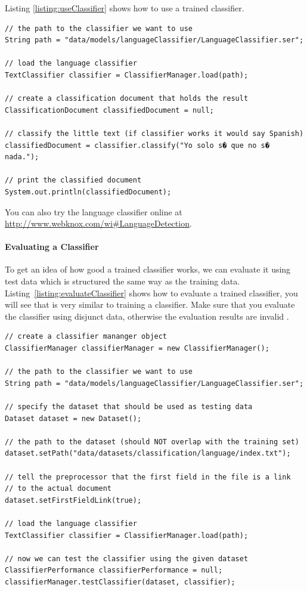 \documentclass[a4paper,twoside]{book}      %
\begin{document}
Listing \ref{listing:useClassifier} shows how to use a trained classifier.

\begin{codelisting}
\begin{lstlisting}[label=listing:useClassifier,caption=Use a trained text classifier.,frame=tb]
// the path to the classifier we want to use
String path = "data/models/languageClassifier/LanguageClassifier.ser";

// load the language classifier
TextClassifier classifier = ClassifierManager.load(path);

// create a classification document that holds the result
ClassificationDocument classifiedDocument = null;

// classify the little text (if classifier works it would say Spanish)
classifiedDocument = classifier.classify("Yo solo s� que no s� nada.");

// print the classified document
System.out.println(classifiedDocument);
\end{lstlisting}
\end{codelisting}

You can also try the language classifier online at \url{http://www.webknox.com/wi#LanguageDetection}.

\paragraph{Evaluating a Classifier}
To get an idea of how good a trained classifier works, we can evaluate it using test data which is structured the same way as the training data. Listing~\ref{listing:evaluateClassifier} shows how to evaluate a trained classifier, you will see that is very similar to training a classifier. Make sure that you evaluate the classifier using disjunct data, otherwise the evaluation results are invalid .

\begin{codelisting}
\begin{lstlisting}[label=listing:evaluateClassifier,caption=Evaluating a trained text classifier.,frame=tb]
// create a classifier mananger object
ClassifierManager classifierManager = new ClassifierManager();

// the path to the classifier we want to use
String path = "data/models/languageClassifier/LanguageClassifier.ser";

// specify the dataset that should be used as testing data
Dataset dataset = new Dataset();

// the path to the dataset (should NOT overlap with the training set)
dataset.setPath("data/datasets/classification/language/index.txt");

// tell the preprocessor that the first field in the file is a link
// to the actual document
dataset.setFirstFieldLink(true);

// load the language classifier
TextClassifier classifier = ClassifierManager.load(path);

// now we can test the classifier using the given dataset
ClassifierPerformance classifierPerformance = null;
classifierManager.testClassifier(dataset, classifier);
\end{lstlisting}
\end{codelisting}
\end{document}
